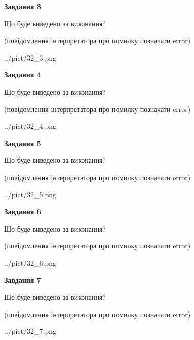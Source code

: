 \documentclass[12pt, ukrainian]{article}
\begin{document}
{\begin {large}
{\begin {center}\textbf{Завдання 3}\end {center}}\par
Що буде виведено за виконання?\par
 (повідомлення інтерпретатора про помилку позначати error)\par
\begin{center}
	{../pict/32_3.png}
\end{center}
\newpage

{\begin {center}\textbf{Завдання 4}\end {center}}\par
Що буде виведено за виконання?\par
 (повідомлення інтерпретатора про помилку позначати error)\par
\begin{center}
	{../pict/32_4.png}
\end{center}
\newpage

{\begin {center}\textbf{Завдання 5}\end {center}}\par
Що буде виведено за виконання?\par
 (повідомлення інтерпретатора про помилку позначати error)\par
\begin{center}
	{../pict/32_5.png}
\end{center}
\newpage

{\begin {center}\textbf{Завдання 6}\end {center}}\par
Що буде виведено за виконання?\par
 (повідомлення інтерпретатора про помилку позначати error)\par
\begin{center}
	{../pict/32_6.png}
\end{center}
\newpage

{\begin {center}\textbf{Завдання 7}\end {center}}\par
Що буде виведено за виконання?\par
 (повідомлення інтерпретатора про помилку позначати error)\par
\begin{center}
	{../pict/32_7.png}
\end{center}
\newpage


\end{large}}
\end{document}
